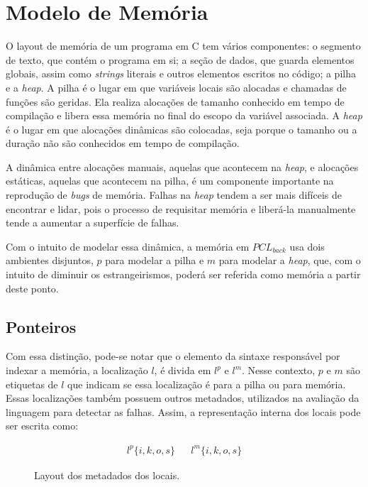 \section{Modelo de Memória}

O layout de memória de um programa em C tem vários componentes: o segmento de texto, que contém o programa em si; a seção de dados, que guarda elementos globais, assim como \emph{strings} literais e outros elementos escritos no código; a pilha e a \emph{heap}. A pilha é o lugar em que variáveis locais são alocadas e chamadas de funções são geridas. Ela realiza alocações de tamanho conhecido em tempo de compilação e libera essa memória no final do escopo da variável associada. A \emph{heap} é o lugar em que alocações dinâmicas são colocadas, seja porque o tamanho ou a duração não são conhecidos em tempo de compilação.

A dinâmica entre alocações manuais, aquelas que acontecem na \emph{heap}, e alocações estáticas, aquelas que acontecem na pilha, é um componente importante na reprodução de \emph{bugs} de memória. Falhas na \emph{heap} tendem a ser mais difíceis de encontrar e lidar, pois o processo de requisitar memória e liberá-la manualmente tende a aumentar a superfície de falhas. 

Com o intuito de modelar essa dinâmica, a memória em $PCL_{back}$ usa dois ambientes disjuntos, $p$ para modelar a pilha e $m$ para modelar a \emph{heap}, que, com o intuito de diminuir os estrangeirismos, poderá ser referida como memória a partir deste ponto. 

\subsection{Ponteiros}
\label{sec:pcl-back:ptr}

Com essa distinção, pode-se notar que o elemento da sintaxe responsável por indexar a memória, a localização $l$, é divida em $l^p$ e $l^m$. Nesse contexto, $p$ e $m$ são etiquetas de $l$ que indicam se essa localização é para a pilha ou para memória. Essas localizações também possuem outros metadados, utilizados na avaliação da linguagem para detectar as falhas. Assim, a representação interna dos locais pode ser escrita como:
\begin{figure*}[ht]
	\begin{align*}
		l^p\{i, k, o, s \} && l^m\{i, k, o, s \}
	\end{align*}
	\caption{Layout dos metadados dos locais.}
	\label{fig:ptr:metada}
\end{figure*}

